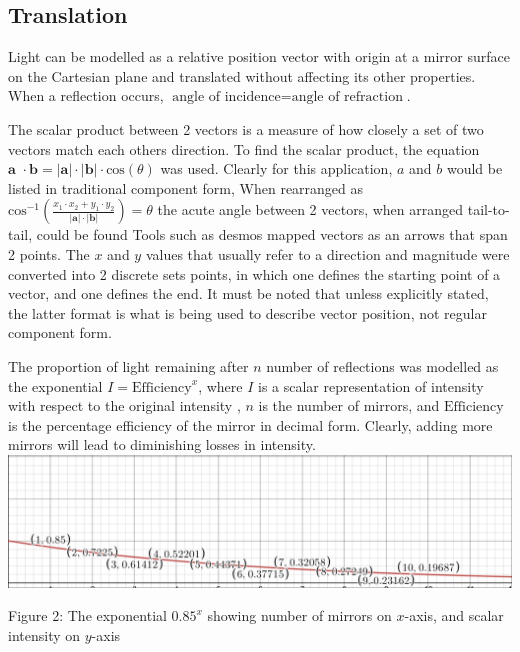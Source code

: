 \documentclass[11pt, letterpaper]{article}
\begin{document}
\subsection{Translation}
\par 



Light can be modelled as a relative position vector with origin at a mirror surface on the Cartesian plane and translated without affecting its other properties. When a reflection occurs, $\textrm{angle  of incidence} = \textrm{angle of refraction}$.
 
The scalar product between 2 vectors is a measure of how closely a set of two vectors match each others direction. To find the scalar product, the equation $\textbf{a }\cdot \textbf{b}=|\textbf{a}|\cdot|\textbf{b}| \cdot \textrm{cos}(\theta)$ was used. Clearly for this application, $a$ and $b$ would be listed in traditional component form, When rearranged as $\textrm{cos}^{-1}{(\frac{x_1 \cdot x_2 + y_1 \cdot y_2}{|\textbf{a}|\cdot|\textbf{b}|})} = \theta$ the acute angle between 2 vectors, when arranged tail-to-tail, could be found
\newline
Tools such as desmos mapped vectors as an arrows that span 2 points. The $x$ and $y$ values that usually refer to a direction and magnitude were converted into 2 discrete sets points, in which one defines the starting point of a vector, and one defines the end. It must be noted that unless explicitly stated, the latter format is what is being used to describe vector position, not regular component form.
\par

The proportion of light remaining after $n$ number of reflections was modelled as the exponential $I=\textrm{Efficiency}^x$, where $I$ is a scalar representation of intensity with respect to the original intensity , $n$ is the number of mirrors, and $\textrm{Efficiency}$ is the percentage  efficiency of the mirror in decimal form. Clearly, adding more mirrors will lead to diminishing losses in intensity.
\newline
\includegraphics[width=16cm]{Diagram 7.jpg}
\begin{center}
{Figure 2: The exponential $0.85^x$ showing number of mirrors on $x$-axis, and scalar intensity on $y$-axis}
\end{center}
\end{document}
